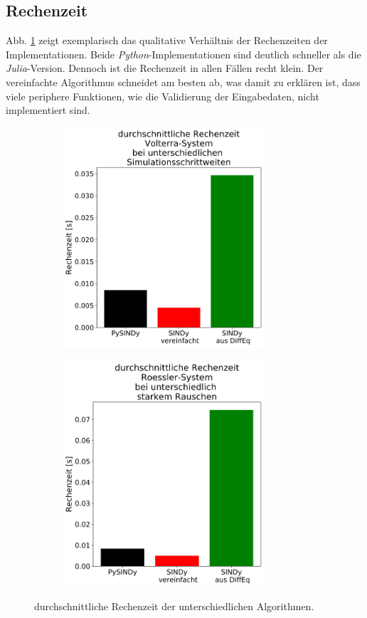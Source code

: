\subsection{Rechenzeit}
Abb. \ref{fig:time} zeigt exemplarisch das qualitative Verhältnis der Rechenzeiten der Implementationen. Beide \textit{Python}-Implementationen sind deutlich schneller als die \textit{Julia}-Version. Dennoch ist die Rechenzeit in allen Fällen recht klein. Der vereinfachte Algorithmus schneidet am besten ab, was damit zu erklären ist, dass viele periphere Funktionen, wie die Validierung der Eingabedaten, nicht implementiert sind.

\begin{figure}[h!] %
	\centering
	\begin{subfigure}{.5\textwidth}
	  \centering
	  \includegraphics[width=75mm]{images/time_volterra_dt.png}
	\end{subfigure}%
	\begin{subfigure}{.5\textwidth}
	  \centering
	  \includegraphics[width=75mm]{images/time_roessler_noise.png}
	\end{subfigure}
	\caption{durchschnittliche Rechenzeit der unterschiedlichen Algorithmen.}
	\label{fig:time}
\end{figure}


